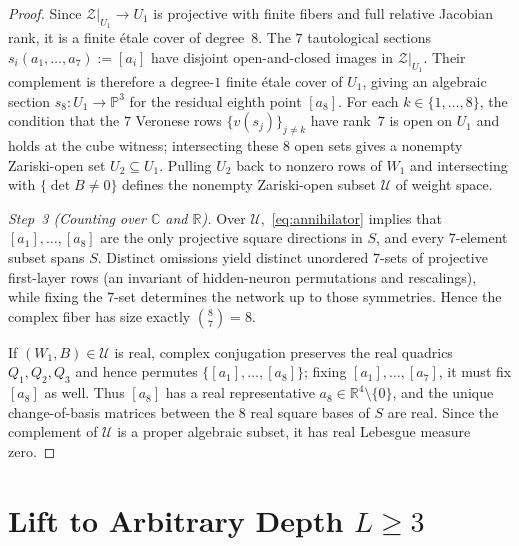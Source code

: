 \documentclass[11pt]{article}
\theoremstyle{plain}
\theoremstyle{definition}
\theoremstyle{remark}
\begin{document}
\begin{proof}
Since $\mathcal{Z}|_{U_1} \to U_1$ is projective with finite fibers and full relative Jacobian rank, it is a finite \'etale cover of degree~$8$. The $7$ tautological sections $s_i(a_1, \dots, a_7) := [a_i]$ have disjoint open-and-closed images in $\mathcal{Z}|_{U_1}$. Their complement is therefore a degree-$1$ finite \'etale cover of $U_1$, giving an algebraic section $s_8 : U_1 \to \mathbb{P}^3$ for the residual eighth point $[a_8]$. For each $k \in \{1, \dots, 8\}$, the condition that the $7$ Veronese rows $\{v(s_j)\}_{j \neq k}$ have rank~$7$ is open on $U_1$ and holds at the cube witness; intersecting these $8$ open sets gives a nonempty Zariski-open set $U_2 \subseteq U_1$. Pulling $U_2$ back to nonzero rows of $W_1$ and intersecting with $\{\det B \neq 0\}$ defines the nonempty Zariski-open subset $\mathcal{U}$ of weight space.

\emph{Step~3 (Counting over $\mathbb{C}$ and $\mathbb{R}$).} Over $\mathcal{U}$,~\eqref{eq:annihilator} implies that $[a_1], \dots, [a_8]$ are the only projective square directions in $S$, and every $7$-element subset spans $S$. Distinct omissions yield distinct unordered $7$-sets of projective first-layer rows (an invariant of hidden-neuron permutations and rescalings), while fixing the $7$-set determines the network up to those symmetries. Hence the complex fiber has size exactly $\binom{8}{7} = 8$.

If $(W_1, B) \in \mathcal{U}$ is real, complex conjugation preserves the real quadrics $Q_1, Q_2, Q_3$ and hence permutes $\{[a_1], \dots, [a_8]\}$; fixing $[a_1], \dots, [a_7]$, it must fix $[a_8]$ as well. Thus $[a_8]$ has a real representative $a_8 \in \mathbb{R}^4 \setminus \{0\}$, and the unique change-of-basis matrices between the $8$ real square bases of $S$ are real. Since the complement of $\mathcal{U}$ is a proper algebraic subset, it has real Lebesgue measure zero.
\end{proof}

\section{Lift to Arbitrary Depth \texorpdfstring{$L \ge 3$}{L >= 3}}
\end{document}
